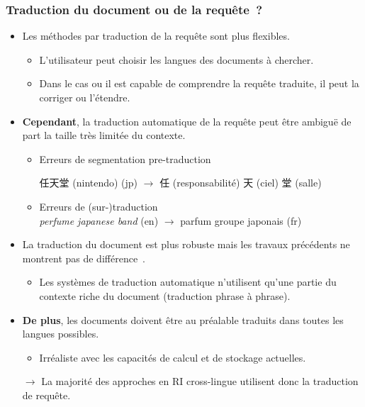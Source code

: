 \documentclass[11pt,aspectratio=43,dvipsnames,table]{beamer}
\begin{document}
\begin{frame}[allowframebreaks]
    \frametitle{Traduction du document ou de la requête~?}
    \begin{itemize} \itemsep10pt
        \item Les méthodes par traduction de la requête sont plus flexibles.
        \begin{itemize}
            \item L'utilisateur peut choisir les langues des documents à
                  chercher.
            \item Dans le cas ou il est capable de comprendre la requête 
                  traduite, il peut la corriger ou l'étendre.
        \end{itemize}
        \item \textbf{Cependant}, la traduction automatique de la requête peut 
              être ambiguë de part la taille très limitée du contexte.
        \begin{itemize}
            \item Erreurs de segmentation pre-traduction \\
                  \begin{CJK}{UTF8}{min}
                  任天堂 (nintendo) (jp) $\to$  任 (responsabilité) 天 (ciel) 
                  堂 (salle)
                  \end{CJK}
            \item Erreurs de (sur-)traduction \\
                  \textit{perfume japanese band} (en) $\to$ parfum groupe 
                  japonais (fr)        
        \end{itemize}

        \framebreak

        \item La traduction du document est plus robuste mais les travaux 
              précédents ne montrent pas de différence~\cite{McCarley:1999}.
        \begin{itemize}
            \item Les systèmes de traduction automatique n'utilisent qu'une 
                  partie du contexte riche du document (traduction phrase à 
                  phrase).
        \end{itemize}
        \item \textbf{De plus}, les documents doivent être au préalable traduits
              dans toutes les langues possibles.
        \begin{itemize}
            \item Irréaliste avec les capacités de calcul et de stockage 
                  actuelles.
        \end{itemize}
        \item[$\to$] La majorité des approches en RI cross-lingue utilisent donc
                     la traduction de requête.
    \end{itemize}
\end{frame}
\end{document}
